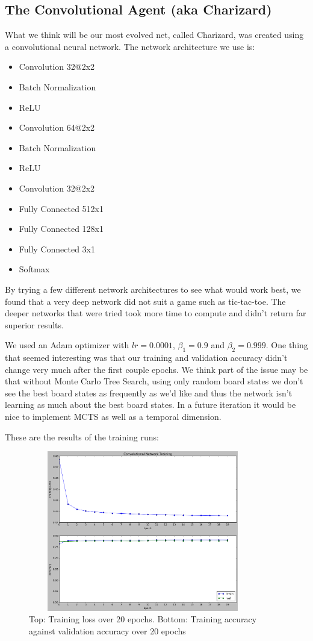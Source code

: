 
\subsection{The Convolutional Agent (aka Charizard)}

What we think will be our most evolved net, called Charizard, was created using a convolutional neural network.
The network architecture we use is:
\begin{itemize}
    \item Convolution 32@2x2
    \item Batch Normalization
    \item ReLU
    \item Convolution 64@2x2
    \item Batch Normalization
    \item ReLU
    \item Convolution 32@2x2
    \item Fully Connected 512x1
    \item Fully Connected 128x1
    \item Fully Connected 3x1
    \item Softmax
\end{itemize}
By trying a few different network architectures to see what would work best, we found that a very deep network did not suit a game such as tic-tac-toe.
The deeper networks that were tried took more time to compute and didn't return far superior results.

We used an Adam optimizer with $lr = 0.0001$, $\beta_1 = 0.9$ and $\beta_2 = 0.999$.
One thing that seemed interesting was that our training and validation accuracy didn't change very much after the first couple epochs.
We think part of the issue may be that without Monte Carlo Tree Search, using only random board states we don't see the best board states as frequently as we'd like and thus the network isn't learning as much about the best board states.
In a future iteration it would be nice to implement MCTS as well as a temporal dimension.

These are the results of the training runs:
\begin{figure}[h!]
	\centering
	\includegraphics[width=10cm, height=7cm]{convolutional-net-training.png}
	\caption{Top: Training loss over 20 epochs.
    Bottom: Training accuracy against validation accuracy over 20 epochs}
	\label{fig:conv_net}
\end{figure}
